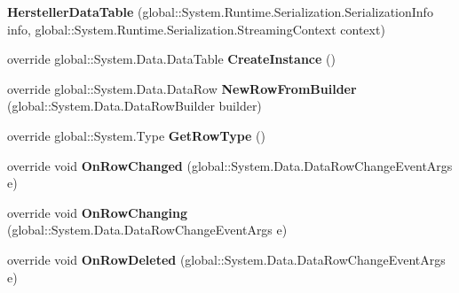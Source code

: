 \begin{DoxyCompactItemize}
\item 
{\bfseries Hersteller\+Data\+Table} (global\+::\+System.\+Runtime.\+Serialization.\+Serialization\+Info info, global\+::\+System.\+Runtime.\+Serialization.\+Streaming\+Context context)\hypertarget{class_products_1_1_data_1_1ds_sage_1_1_hersteller_data_table_a992b85eb0b7ac2d7cf5c6653e4eeaeaa}{}\label{class_products_1_1_data_1_1ds_sage_1_1_hersteller_data_table_a992b85eb0b7ac2d7cf5c6653e4eeaeaa}

\item 
override global\+::\+System.\+Data.\+Data\+Table {\bfseries Create\+Instance} ()\hypertarget{class_products_1_1_data_1_1ds_sage_1_1_hersteller_data_table_a76d4b2e9e190fcaf891c2ce4abbe6164}{}\label{class_products_1_1_data_1_1ds_sage_1_1_hersteller_data_table_a76d4b2e9e190fcaf891c2ce4abbe6164}

\item 
override global\+::\+System.\+Data.\+Data\+Row {\bfseries New\+Row\+From\+Builder} (global\+::\+System.\+Data.\+Data\+Row\+Builder builder)\hypertarget{class_products_1_1_data_1_1ds_sage_1_1_hersteller_data_table_a3371fb0ee254d3e7d82b5ce4977d1d07}{}\label{class_products_1_1_data_1_1ds_sage_1_1_hersteller_data_table_a3371fb0ee254d3e7d82b5ce4977d1d07}

\item 
override global\+::\+System.\+Type {\bfseries Get\+Row\+Type} ()\hypertarget{class_products_1_1_data_1_1ds_sage_1_1_hersteller_data_table_a4688e47fe9aaaeed8aaf41df22935ed3}{}\label{class_products_1_1_data_1_1ds_sage_1_1_hersteller_data_table_a4688e47fe9aaaeed8aaf41df22935ed3}

\item 
override void {\bfseries On\+Row\+Changed} (global\+::\+System.\+Data.\+Data\+Row\+Change\+Event\+Args e)\hypertarget{class_products_1_1_data_1_1ds_sage_1_1_hersteller_data_table_aa655fcfc67a7dbf8e295761517bec9b6}{}\label{class_products_1_1_data_1_1ds_sage_1_1_hersteller_data_table_aa655fcfc67a7dbf8e295761517bec9b6}

\item 
override void {\bfseries On\+Row\+Changing} (global\+::\+System.\+Data.\+Data\+Row\+Change\+Event\+Args e)\hypertarget{class_products_1_1_data_1_1ds_sage_1_1_hersteller_data_table_a5d64c423071381b4e66948caeb30e485}{}\label{class_products_1_1_data_1_1ds_sage_1_1_hersteller_data_table_a5d64c423071381b4e66948caeb30e485}

\item 
override void {\bfseries On\+Row\+Deleted} (global\+::\+System.\+Data.\+Data\+Row\+Change\+Event\+Args e)\hypertarget{class_products_1_1_data_1_1ds_sage_1_1_hersteller_data_table_aae6c62d9c9ccb8ffdaa6ea8ae33b8226}{}\label{class_products_1_1_data_1_1ds_sage_1_1_hersteller_data_table_aae6c62d9c9ccb8ffdaa6ea8ae33b8226}


\end{DoxyCompactItemize}

